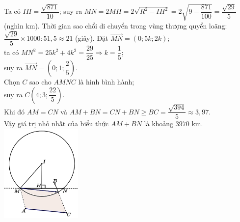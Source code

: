 \begin{ex}
{\begin{itemchoice}
            Ta có $IH=\dfrac{\sqrt{871}}{10}$; suy ra $MN=2MH=2\sqrt{R^2-IH^2}=2\sqrt{9-\dfrac{871}{100}}=\dfrac{\sqrt{29}}{5}$ (nghìn km).
            Thời gian sao chổi di chuyển trong vùng thượng quyển loãng: $\dfrac{\sqrt{29}}{5}\times 1000\colon 51{,}5\approx 21$ (giây).
            \immini
            {
                \itemch Đặt $\vec{MN}=(0;5k;2k)$;\\
                ta có $MN^2=25k^2+4k^2=\dfrac{29}{25}\Rightarrow k=\dfrac{1}{5}$;\\
                suy ra $\vec{MN}=\left(0;1;\dfrac{2}{5}\right)$.\\
            Chọn $C$ sao cho $AMNC$ là hình bình hành;\\
            suy ra $C\left(4;3;\dfrac{22}{5}\right)$.\\
            Khi đó $AM=CN$ và $AM+BN=CN+BN\ge BC=\dfrac{\sqrt{394}}{5}\approx 3{,}97$.\\
            Vậy giá trị nhỏ nhất của biểu thức $AM+BN$ là khoảng $3970$ km.
            }
            {
                \includegraphics[width=4cm]{img/HXN-2-15-LG}
            }
        \end{itemchoice}
    }
\end{ex}

